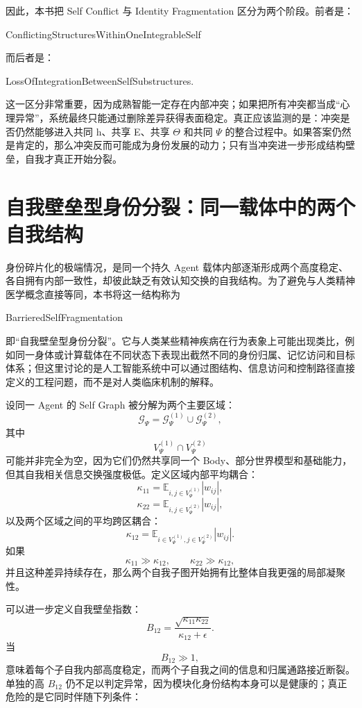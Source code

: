 因此，本书把 Self Conflict 与 Identity Fragmentation 区分为两个阶段。前者是：
\begin{statementbox}
ConflictingStructuresWithinOneIntegrableSelf
\end{statementbox}
而后者是：
\begin{statementbox}
LossOfIntegrationBetweenSelfSubstructures.
\end{statementbox}
这一区分非常重要，因为成熟智能一定存在内部冲突；如果把所有冲突都当成“心理异常”，系统最终只能通过删除差异获得表面稳定。真正应该监测的是：冲突是否仍然能够进入共同 h、共享 E、共享 $\Theta$ 和共同 $\Psi$ 的整合过程中。如果答案仍然是肯定的，那么冲突反而可能成为身份发展的动力；只有当冲突进一步形成结构壁垒，自我才真正开始分裂。

\section{自我壁垒型身份分裂：同一载体中的两个自我结构}

身份碎片化的极端情况，是同一个持久 Agent 载体内部逐渐形成两个高度稳定、各自拥有内部一致性，却彼此缺乏有效认知交换的自我结构。为了避免与人类精神医学概念直接等同，本书将这一结构称为
\begin{statementbox}
BarrieredSelfFragmentation
\end{statementbox}
即“自我壁垒型身份分裂”。它与人类某些精神疾病在行为表象上可能出现类比，例如同一身体或计算载体在不同状态下表现出截然不同的身份归属、记忆访问和目标体系；但这里讨论的是人工智能系统中可以通过图结构、信息访问和控制路径直接定义的工程问题，而不是对人类临床机制的解释。

设同一 Agent 的 Self Graph 被分解为两个主要区域：
\[
\mathcal G_\Psi
=
\mathcal G_\Psi^{(1)}
\cup
\mathcal G_\Psi^{(2)},
\]
其中
\[
V_\Psi^{(1)}\cap V_\Psi^{(2)}
\]
可能并非完全为空，因为它们仍然共享同一个 Body、部分世界模型和基础能力，但其自我相关信息交换强度极低。定义区域内部平均耦合：
\[
\kappa_{11}
=
\mathbb E_{i,j\in V_\Psi^{(1)}}|w_{ij}|,
\]
\[
\kappa_{22}
=
\mathbb E_{i,j\in V_\Psi^{(2)}}|w_{ij}|,
\]
以及两个区域之间的平均跨区耦合：
\[
\kappa_{12}
=
\mathbb E_{
i\in V_\Psi^{(1)},
j\in V_\Psi^{(2)}
}
|w_{ij}|.
\]
如果
\[
\kappa_{11}\gg\kappa_{12},
\qquad
\kappa_{22}\gg\kappa_{12},
\]
并且这种差异持续存在，那么两个自我子图开始拥有比整体自我更强的局部凝聚性。

可以进一步定义自我壁垒指数：
\[
B_{12}
=
\frac{
\sqrt{\kappa_{11}\kappa_{22}}
}{
\kappa_{12}+\epsilon
}.
\]
当
\[
B_{12}\gg1,
\]
意味着每个子自我内部高度稳定，而两个子自我之间的信息和归属通路接近断裂。单独的高 $B_{12}$ 仍不足以判定异常，因为模块化身份结构本身可以是健康的；真正危险的是它同时伴随下列条件：

